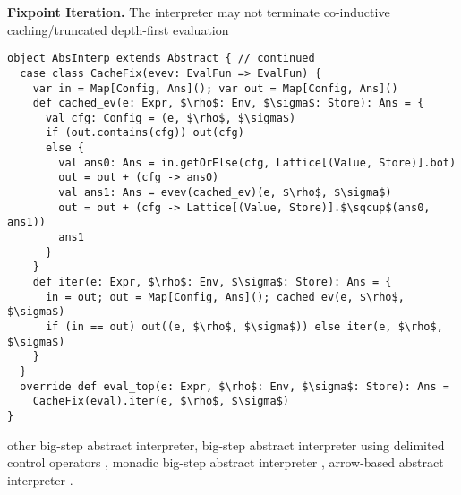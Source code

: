 \textbf{Fixpoint Iteration.}
The interpreter may not terminate
co-inductive caching/truncated depth-first evaluation \cite{DBLP:journals/pacmpl/DaraisLNH17, Wei:2018:RAA:3243631.3236800, Rosendahl:AbsIntPL}

\begin{lstlisting}
object AbsInterp extends Abstract { // continued
  case class CacheFix(evev: EvalFun => EvalFun) {
    var in = Map[Config, Ans](); var out = Map[Config, Ans]()
    def cached_ev(e: Expr, $\rho$: Env, $\sigma$: Store): Ans = {
      val cfg: Config = (e, $\rho$, $\sigma$)
      if (out.contains(cfg)) out(cfg)
      else {
        val ans0: Ans = in.getOrElse(cfg, Lattice[(Value, Store)].bot)
        out = out + (cfg -> ans0)
        val ans1: Ans = evev(cached_ev)(e, $\rho$, $\sigma$)
        out = out + (cfg -> Lattice[(Value, Store)].$\sqcup$(ans0, ans1))
        ans1
      }
    }
    def iter(e: Expr, $\rho$: Env, $\sigma$: Store): Ans = {
      in = out; out = Map[Config, Ans](); cached_ev(e, $\rho$, $\sigma$)
      if (in == out) out((e, $\rho$, $\sigma$)) else iter(e, $\rho$, $\sigma$)
    }
  }
  override def eval_top(e: Expr, $\rho$: Env, $\sigma$: Store): Ans = 
    CacheFix(eval).iter(e, $\rho$, $\sigma$)
}
\end{lstlisting}

other big-step abstract interpreter, 
big-step abstract interpreter using delimited control operators \cite{Wei:2018:RAA:3243631.3236800},
monadic big-step abstract interpreter \cite{DBLP:journals/pacmpl/DaraisLNH17},
arrow-based abstract interpreter \cite{Keidel:2018:CSP:3243631.3236767}.

